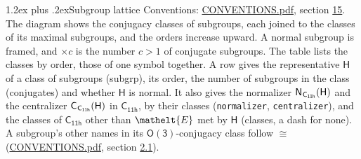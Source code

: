 \documentclass[10pt,a4paper]{article}
\makeatletter
\renewcommand\section{\@startsection{section}{1}{\z@}{-3ex plus -1ex minus -.2ex}%
  {1.2ex plus .2ex}{\normalfont\large\sffamily\bfseries\color{parttitle}}}
\numberwithin{equation}{section}
\newcommand{\eltfont}[1]{{\let\sigma\eltsigma\mathelt{#1}}}
\newcommand{\grp}[1]{\mathsf{#1}}
\newcommand{\cls}[1]{\eltfont{#1}}
\newcommand{\samecls}{\cong}
\newcommand{\hairsp}{\mkern1mu}
\makeatother
\begin{document}
\section{Subgroup lattice}\label{s:subgroups}
Conventions: \href{../../CONVENTIONS.pdf}{CONVENTIONS.pdf}, section \href{../../CONVENTIONS.pdf\#conv.15}{15}.
The diagram shows the conjugacy classes of subgroups, each joined to the classes of its maximal subgroups, and the orders increase upward. \label{n:index.conjugates.c}A normal subgroup is framed, and ${\times}c$ is the number $c > 1$ of conjugate subgroups. The table lists the classes by order, those of one symbol together. \label{n:group.H}\label{n:head.subgroup}\label{n:head.order}\label{n:head.conjugates}\label{n:head.normal}A row gives the representative $\grp{H}$ of a class of subgroups (subgrp), its order, the number of subgroups in the class (conjugates) and whether $\grp{H}$ is normal. \label{n:group.normalizer}\label{n:group.centralizer}\label{n:head.classes}It also gives the normalizer $\grp{N}_{\hairsp \grp{C_{11h}}}(\grp{H})$ and the centralizer $\grp{C}_{\hairsp \grp{C_{11h}}}(\grp{H})$ in $\grp{C_{11h}}$, by their classes (\texttt{normalizer}, \texttt{centralizer}), and the classes of $\grp{C_{11h}}$ other than $\cls{E}$ met by $\grp{H}$ (classes, a dash for none). A subgroup's other names in its \href{O3.pdf}{$\grp{O(3)}$}-conjugacy class follow $\samecls$ (\href{../../CONVENTIONS.pdf}{CONVENTIONS.pdf}, section \href{../../CONVENTIONS.pdf\#conv.2.1}{2.1}).
\begin{center}
\end{center}
\end{document}
